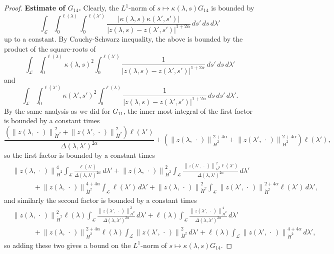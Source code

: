 \documentclass[reqno,centertags,12pt]{amsart}
\theoremstyle{definition}
\numberwithin{equation}{section}
\newcommand{\abs}[1]{\left\lvert#1\right\rvert}
\newcommand{\norm}[1]{\left\|#1\right\|}
\begin{document}
\begin{proof}
    \textbf{Estimate of $G_{14}$.} Clearly, the $L^{1}$-norm of
    $s\mapsto\kappa(\lambda,s)G_{14}$ is bounded by
    \[
        \int_{\mathcal{L}}\int_{0}^{\ell(\lambda)}\int_{0}^{\ell(\lambda')}
        \frac{\abs{\kappa(\lambda,s)\kappa(\lambda',s')}}
        {\abs{z(\lambda,s) - z(\lambda',s')}^{1+2\alpha}}\,ds'\,ds\,d\lambda'
    \]
    up to a constant. By Cauchy-Schwarz inequality, the above is bounded by the product of
    the square-roots of
    \[
        \int_{\mathcal{L}}\int_{0}^{\ell(\lambda)}\kappa(\lambda,s)^{2}
        \int_{0}^{\ell(\lambda')}\frac{1}{\abs{z(\lambda,s) - z(\lambda',s')}^{1+2\alpha}}
        \,ds'\,ds\,d\lambda'
    \]
    and
    \[
        \int_{\mathcal{L}}\int_{0}^{\ell(\lambda')}\kappa(\lambda',s')^{2}
        \int_{0}^{\ell(\lambda)}\frac{1}{\abs{z(\lambda,s) - z(\lambda',s')}^{1+2\alpha}}
        \,ds\,ds'\,d\lambda'.
    \]
    By the same analysis as we did for $G_{11}$, the inner-most integral of the
    first factor is bounded by a constant times
    \[
        \frac{\left(
            \norm{z(\lambda,\,\cdot\,)}_{\dot{H}^{2}}^{2}
            + \norm{z(\lambda',\,\cdot\,)}_{\dot{H}^{2}}^{2}
        \right)\ell(\lambda')}
        {\Delta(\lambda,\lambda')^{2\alpha}}
        +\left(\norm{z(\lambda,\,\cdot\,)}_{\dot{H}^{2}}^{2+4\alpha}
        + \norm{z(\lambda',\,\cdot\,)}_{\dot{H}^{2}}^{2+4\alpha}\right)\ell(\lambda'),
    \]
    so the first factor is bounded by a constant times
    \begin{align*}
        &\norm{z(\lambda,\,\cdot\,)}_{\dot{H}^{2}}^{4}
        \int_{\mathcal{L}}\frac{\ell(\lambda')}{\Delta(\lambda,\lambda')^{2\alpha}}\,d\lambda'
        + \norm{z(\lambda,\,\cdot\,)}_{\dot{H}^{2}}^{2}
        \int_{\mathcal{L}}\frac{\norm{z(\lambda',\,\cdot\,)}_{\dot{H}^{2}}^{2}\ell(\lambda')}
        {\Delta(\lambda,\lambda')^{2\alpha}}\,d\lambda' \\
        &\quad\quad\quad
        + \norm{z(\lambda,\,\cdot\,)}_{\dot{H}^{2}}^{4+4\alpha}
        \int_{\mathcal{L}}\ell(\lambda')\,d\lambda'
        + \norm{z(\lambda,\,\cdot\,)}_{\dot{H}^{2}}^{2}
        \int_{\mathcal{L}}\norm{z(\lambda',\,\cdot\,)}_{\dot{H}^{2}}^{2+4\alpha}
        \ell(\lambda')\,d\lambda',
    \end{align*}
    and similarly the second factor is bounded by a constant times
    \begin{align*}
        &\norm{z(\lambda,\,\cdot\,)}_{\dot{H}^{2}}^{2}\ell(\lambda)
        \int_{\mathcal{L}}\frac{\norm{z(\lambda',\,\cdot\,)}_{\dot{H}^{2}}^{2}}
        {\Delta(\lambda,\lambda')^{2\alpha}}\,d\lambda'
        + \ell(\lambda) \int_{\mathcal{L}}
        \frac{\norm{z(\lambda',\,\cdot\,)}_{\dot{H}^{2}}^{4}}
        {\Delta(\lambda,\lambda')^{2\alpha}}\,d\lambda' \\
        &\quad\quad\quad
        + \norm{z(\lambda,\,\cdot\,)}_{\dot{H}^{2}}^{2+4\alpha}\ell(\lambda)
        \int_{\mathcal{L}}\norm{z(\lambda',\,\cdot\,)}_{\dot{H}^{2}}^{2}\,d\lambda'
        + \ell(\lambda) \int_{\mathcal{L}}
        \norm{z(\lambda',\,\cdot\,)}_{\dot{H}^{2}}^{4+4\alpha}\,d\lambda',
    \end{align*}
    so adding these two gives a bound on the $L^{1}$-norm of
    $s\mapsto\kappa(\lambda,s)G_{14}$.
\end{proof}
\end{document}
